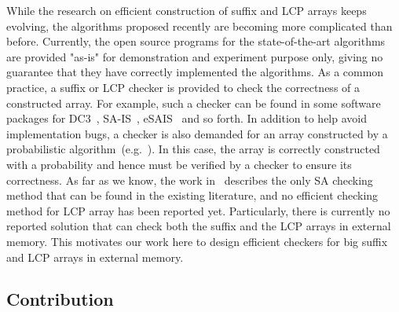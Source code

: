 \documentclass[10pt,journal,compsoc]{IEEEtran}
\begin{document}
While the research on efficient construction of suffix and LCP arrays keeps evolving, the algorithms proposed recently are becoming more complicated than before. Currently, the open source programs for the state-of-the-art algorithms are provided "as-is" for demonstration and experiment purpose only, giving no guarantee that they have correctly implemented the algorithms. As a common practice, a suffix or LCP checker is provided to check the correctness of a constructed array. For example, such a checker can be found in some software packages for DC3~\cite{Dementiev08}, SA-IS~\cite{Nong11}, eSAIS~\cite{Bingmann12} and so forth. In addition to help avoid implementation bugs, a checker is also demanded for an array constructed by a probabilistic algorithm~(e.g.~\cite{Bille2013}). In this case, the array is correctly constructed with a probability and hence must be verified by a checker to ensure its correctness. As far as we know, the work in~\cite{Burkhardt2003} describes the only SA checking method that can be found in the existing literature, and no efficient checking method for LCP array has been reported yet. Particularly, there is currently no reported solution that can check both the suffix and the LCP arrays in external memory. This motivates our work here to design efficient checkers for big suffix and LCP arrays in external memory.  

	
\subsection{Contribution}\label{sec:introduction:contribution}
\end{document}
